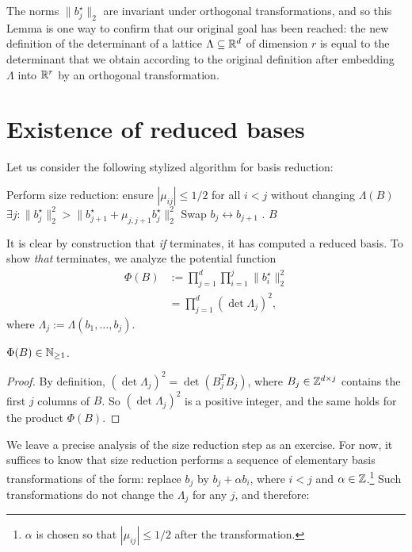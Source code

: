 The norms $\|b_j^\star\|_2$ are invariant under orthogonal transformations,
and so this Lemma is one way to confirm that our original goal has been reached:
the new definition of the determinant of a lattice $\Lambda \subseteq \mathbb{R}^d$ of dimension $r$
is equal to the determinant that we obtain according to the original definition
after embedding $\Lambda$ into $\mathbb{R}^r$ by an orthogonal transformation.



\section{Existence of reduced bases}

Let us consider the following stylized algorithm for basis reduction:
\begin{codebox}
  \li Perform size reduction: ensure $|\mu_{ij}| \leq 1/2$ for all $i < j$ without changing $\Lambda(B)$
  \li \If $\exists j: \|b_j^\star\|_2^2 > \|b_{j+1}^\star + \mu_{j,j+1} b_j^\star\|_2^2$
  \li \Then Swap $b_j \leftrightarrow b_{j+1}$
  \li       {}.
      \End
  \li \Return $B$
\end{codebox}
It is clear by construction that \emph{if}  terminates,
it has computed a reduced basis.
To show \emph{that}  terminates,
we analyze the potential function
\begin{align*}
  \Phi(B) &:= \prod_{j=1}^d \prod_{i=1}^j \|b_i^\star\|_2^2 \\
          &= \prod_{j=1}^d (\det \Lambda_j)^2,
\end{align*}
where $\Lambda_j := \Lambda(b_1,\ldots,b_j)$.
\begin{lemma}
  $\Phi(B) \in \mathbb{N}_{\geq 1}$.
\end{lemma}
\begin{proof}
  By definition, $(\det\Lambda_j)^2 = \det(B_j^T B_j)$,
  where $B_j \in \mathbb{Z}^{d \times j}$ contains the first $j$ columns of $B$.
  So $(\det\Lambda_j)^2$ is a positive integer, and the same holds for the product $\Phi(B)$.
\end{proof}

We leave a precise analysis of the size reduction step as an exercise.
For now, it suffices to know that size reduction performs a sequence
of elementary basis transformations of the form: replace $b_j$ by $b_j + \alpha b_i$,
where $i < j$ and $\alpha \in \mathbb{Z}$.\footnote{$\alpha$ is chosen so that $|\mu_{ij}| \leq 1/2$ after the transformation.}
Such transformations do not change the $\Lambda_j$ for any $j$, and therefore:

